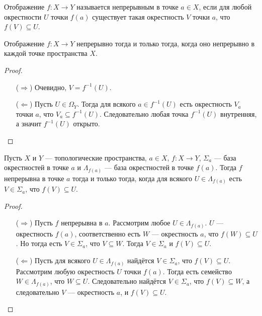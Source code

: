 \documentclass[12pt,a4paper]{article}
\begin{document}
    \begin{definition}
        Отображение $f: X \to Y$ называется непрерывным в точке $a \in X$, если для любой окрестности $U$ точки $f(a)$ существует такая окрестность $V$ точки $a$, что $f(V) \subseteq U$.
    \end{definition}

    \begin{theorem}
        Отображение $f: X \to Y$ непрерывно тогда и только тогда, когда оно непрерывно в каждой точке пространства $X$.
    \end{theorem}

    \begin{proof}
        \begin{itemize}
            \item[($\Rightarrow$)] Очевидно, $V = f^{-1}(U)$.
            \item[($\Leftarrow$)] Пусть $U \in \Omega_Y$. Тогда для всякого $a \in f^{-1}(U)$ есть окрестность $V_a$ точки $a$, что $V_a \subseteq f^{-1}(U)$. Следовательно любая точка $f^{-1}(U)$ внутренняя, а значит $f^{-1}(U)$ открыто.
        \end{itemize}
    \end{proof}

    \begin{theorem}
        Пусть $X$ и $Y$ --- топологические пространства, $a \in X$, $f: X \to Y$, $\Sigma_a$ --- база окрестностей в точке $a$ и $\Lambda_{f(a)}$ --- база окрестностей в точке $f(a)$. Тогда $f$ непрерывна в точке $a$ тогда и только тогда, когда для всякого $U \in \Lambda_{f(a)}$ есть $V \in \Sigma_a$, что $f(V) \subseteq U$.
    \end{theorem}

    \begin{proof}\ 
        \begin{itemize}
            \item[($\Rightarrow$)] Пусть $f$ непрерывна в $a$. Рассмотрим любое $U \in \Lambda_{f(a)}$. $U$ --- окрестность $f(a)$, соответственно есть $W$ --- окрестность $a$, что $f(W) \subseteq U$. Но тогда есть $V \in \Sigma_a$, что $V \subseteq W$. Тогда $V \in \Sigma_a$ и $f(V) \subseteq U$.
            \item[($\Leftarrow$)] Пусть для всякого $U \in \Lambda_{f(a)}$ найдётся $V \in \Sigma_a$, что $f(V) \subseteq U$. Рассмотрим любую окрестность $U$ точки $f(a)$. Тогда есть семейство $W \in \Lambda_{f(a)}$, что $W \subseteq U$. Следовательно найдётся $V \in \Sigma_a$, что $f(V) \subseteq W$, а следовательно $V$ --- окрестность $a$, и $f(V) \subseteq U$.
        \end{itemize}
    \end{proof}
\end{document}

